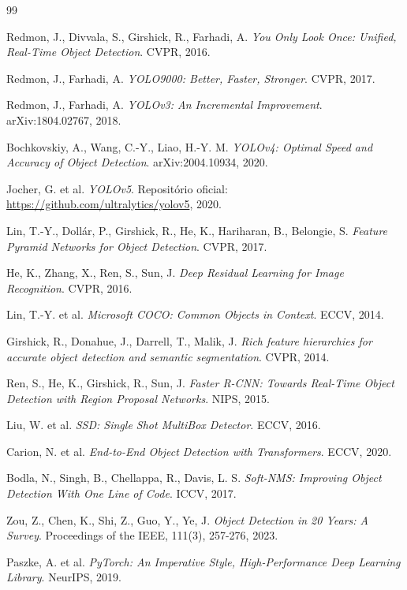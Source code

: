 \documentclass[11pt,a4paper]{article}
\begin{document}
\begin{thebibliography}{99}

Redmon, J., Divvala, S., Girshick, R., Farhadi, A. \emph{You Only Look Once: Unified, Real-Time Object Detection}. CVPR, 2016.

Redmon, J., Farhadi, A. \emph{YOLO9000: Better, Faster, Stronger}. CVPR, 2017.

Redmon, J., Farhadi, A. \emph{YOLOv3: An Incremental Improvement}. arXiv:1804.02767, 2018.

Bochkovskiy, A., Wang, C.-Y., Liao, H.-Y. M. \emph{YOLOv4: Optimal Speed and Accuracy of Object Detection}. arXiv:2004.10934, 2020.

Jocher, G. et al. \emph{YOLOv5}. Repositório oficial: \url{https://github.com/ultralytics/yolov5}, 2020.

Lin, T.-Y., Dollár, P., Girshick, R., He, K., Hariharan, B., Belongie, S. \emph{Feature Pyramid Networks for Object Detection}. CVPR, 2017.

He, K., Zhang, X., Ren, S., Sun, J. \emph{Deep Residual Learning for Image Recognition}. CVPR, 2016.

Lin, T.-Y. et al. \emph{Microsoft COCO: Common Objects in Context}. ECCV, 2014.

Girshick, R., Donahue, J., Darrell, T., Malik, J. \emph{Rich feature hierarchies for accurate object detection and semantic segmentation}. CVPR, 2014.

Ren, S., He, K., Girshick, R., Sun, J. \emph{Faster R-CNN: Towards Real-Time Object Detection with Region Proposal Networks}. NIPS, 2015.

Liu, W. et al. \emph{SSD: Single Shot MultiBox Detector}. ECCV, 2016.

Carion, N. et al. \emph{End-to-End Object Detection with Transformers}. ECCV, 2020.

Bodla, N., Singh, B., Chellappa, R., Davis, L. S. \emph{Soft-NMS: Improving Object Detection With One Line of Code}. ICCV, 2017.

Zou, Z., Chen, K., Shi, Z., Guo, Y., Ye, J. \emph{Object Detection in 20 Years: A Survey}. Proceedings of the IEEE, 111(3), 257-276, 2023.

Paszke, A. et al. \emph{PyTorch: An Imperative Style, High-Performance Deep Learning Library}. NeurIPS, 2019.

\end{thebibliography}
\end{document}
